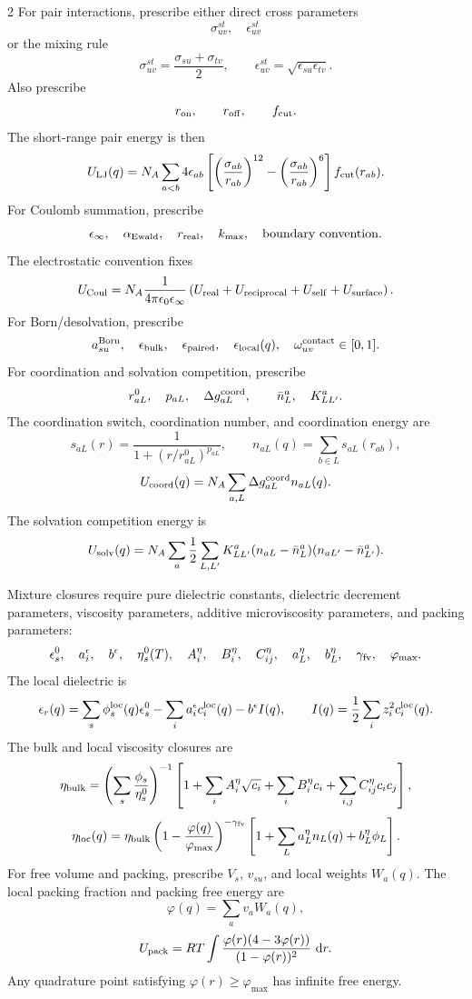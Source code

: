 \documentclass[10pt]{article}
\newcommand{\dd}{\,\mathrm d}
\begin{document}
\begin{multicols}{2}
For pair interactions, prescribe either direct cross parameters
\[
\sigma_{uv}^{st},\quad \epsilon_{uv}^{st}
\]
or the mixing rule
\[
\sigma_{uv}^{st}=\frac{\sigma_{su}+\sigma_{tv}}{2},
\qquad
\epsilon_{uv}^{st}=\sqrt{\epsilon_{su}\epsilon_{tv}}.
\]
Also prescribe
\[
r_{\rm on},\qquad r_{\rm off},\qquad f_{\rm cut}.
\]
The short-range pair energy is then
\[
U_{\rm LJ}(q)
=
N_A\sum_{a<b}
4\epsilon_{ab}
\left[
\left(\frac{\sigma_{ab}}{r_{ab}}\right)^{12}
-
\left(\frac{\sigma_{ab}}{r_{ab}}\right)^6
\right]
f_{\rm cut}(r_{ab}).
\]
For Coulomb summation, prescribe
\[
\epsilon_\infty,\quad \alpha_{\rm Ewald},\quad r_{\rm real},\quad
k_{\max},\quad {\rm boundary\ convention}.
\]
The electrostatic convention fixes
\[
U_{\rm Coul}
=
N_A\frac{1}{4\pi\epsilon_0\epsilon_\infty}
\left(
U_{\rm real}
+U_{\rm reciprocal}
+U_{\rm self}
+U_{\rm surface}
\right).
\]
For Born/desolvation, prescribe
\[
a_{su}^{\rm Born},\quad
\epsilon_{\rm bulk},\quad
\epsilon_{\rm paired},\quad
\epsilon_{\rm local}(q),\quad
\omega_{uv}^{\rm contact}\in[0,1].
\]
For coordination and solvation competition, prescribe
\[
r_{aL}^0,\quad p_{aL},\quad \Delta g_{aL}^{\rm coord},
\qquad
\bar n_L^a,\quad K_{LL'}^a.
\]
The coordination switch, coordination number, and coordination energy are
\[
s_{aL}(r)=\frac{1}{1+(r/r_{aL}^0)^{p_{aL}}},
\qquad
n_{aL}(q)=\sum_{b\in L}s_{aL}(r_{ab}),
\]
\[
U_{\rm coord}(q)
=
N_A\sum_{a,L}\Delta g_{aL}^{\rm coord}n_{aL}(q).
\]
The solvation competition energy is
\[
U_{\rm solv}(q)
=
N_A\sum_a\frac12
\sum_{L,L'}
K_{LL'}^a
(n_{aL}-\bar n_L^a)
(n_{aL'}-\bar n_{L'}^a).
\]

Mixture closures require pure dielectric constants, dielectric decrement
parameters, viscosity parameters, additive microviscosity parameters, and
packing parameters:
\[
\epsilon_s^0,\quad a_i^\epsilon,\quad b^\epsilon,
\quad
\eta_s^0(T),\quad A_i^\eta,\quad B_i^\eta,\quad C_{ij}^\eta,
\quad
a_L^\eta,\quad b_L^\eta,\quad \gamma_{\rm fv},\quad
\varphi_{\max}.
\]
The local dielectric is
\[
\epsilon_r(q)
=
\sum_s\phi_s^{\rm loc}(q)\epsilon_s^0
-
\sum_i a_i^\epsilon c_i^{\rm loc}(q)
-
b^\epsilon I(q),
\qquad
I(q)=\frac12\sum_i z_i^2c_i^{\rm loc}(q).
\]
The bulk and local viscosity closures are
\[
\eta_{\rm bulk}
=
\left(\sum_s\frac{\phi_s}{\eta_s^0}\right)^{-1}
\left[
1+\sum_iA_i^\eta\sqrt{c_i}
+\sum_iB_i^\eta c_i
+\sum_{i,j}C_{ij}^\eta c_ic_j
\right],
\]
\[
\eta_{\rm loc}(q)
=
\eta_{\rm bulk}
\left(1-\frac{\varphi(q)}{\varphi_{\max}}\right)^{-\gamma_{\rm fv}}
\left[
1+\sum_La_L^\eta n_L(q)+b_L^\eta\phi_L
\right].
\]
For free volume and packing, prescribe \(V_s\), \(v_{su}\), and local weights
\(W_a(q)\). The local packing fraction and packing free energy are
\[
\varphi(q)=\sum_av_aW_a(q),
\]
\[
U_{\rm pack}
=
RT\int
\frac{\varphi(r)(4-3\varphi(r))}
{(1-\varphi(r))^2}\,\dd r.
\]
Any quadrature point satisfying \(\varphi(r)\ge\varphi_{\max}\) has infinite
free energy.


\end{multicols}
\end{document}
